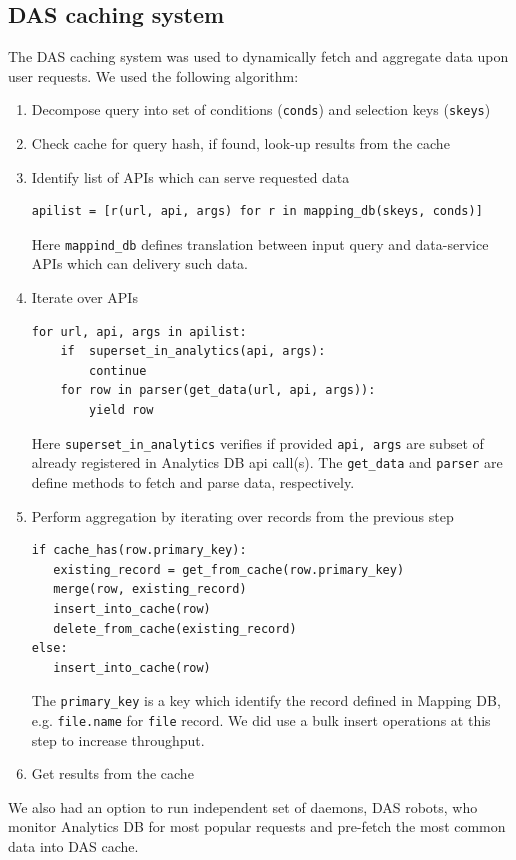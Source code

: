 \documentclass[1p,times]{elsarticle}
\begin{document}
\subsection{DAS caching system}
The DAS caching system was used to dynamically fetch
and aggregate data upon user requests. We used the following 
algorithm:
\begin{enumerate}[1.]
\item Decompose query into set of conditions (\verb+conds+) 
and selection keys (\verb+skeys+)
\item Check cache for query hash, if found, look-up results from the cache
\item Identify list of APIs which can serve requested data
\begin{verbatim}
apilist = [r(url, api, args) for r in mapping_db(skeys, conds)]
\end{verbatim}
Here \verb+mappind_db+ defines translation between input query and data-service
APIs which can delivery such data.
\item Iterate over APIs
\begin{verbatim}
for url, api, args in apilist:
    if  superset_in_analytics(api, args):
        continue
    for row in parser(get_data(url, api, args)):
        yield row
\end{verbatim}
Here \verb+superset_in_analytics+ verifies if provided \verb+api, args+
are subset of already registered in Analytics DB api call(s). The 
\verb+get_data+ and \verb+parser+ are define methods to fetch and parse
data, respectively.
\item Perform aggregation by iterating over records from the previous step
\begin{verbatim}
if cache_has(row.primary_key):
   existing_record = get_from_cache(row.primary_key)
   merge(row, existing_record)
   insert_into_cache(row)
   delete_from_cache(existing_record)
else:
   insert_into_cache(row)
\end{verbatim}
The \verb+primary_key+
is a key which identify the record defined in Mapping DB, e.g. \verb+file.name+
for \verb+file+ record.
We did use a bulk insert operations at this step to increase throughput. 
\item Get results from the cache
\end{enumerate}
We also had an option to run independent set of daemons, DAS robots, who
monitor Analytics DB for most popular requests and pre-fetch the most
common data into DAS cache. 
\end{document}
